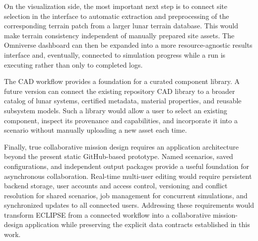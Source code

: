 On the visualization side, the most important next step is to connect site selection in the interface to automatic extraction and preprocessing of the corresponding terrain patch from a larger lunar terrain database. This would make terrain consistency independent of manually prepared site assets. The Omniverse dashboard can then be expanded into a more resource-agnostic results interface and, eventually, connected to simulation progress while a run is executing rather than only to completed logs.

The CAD workflow provides a foundation for a curated component library. A future version can connect the existing repository CAD library to a broader catalog of lunar systems, certified metadata, material properties, and reusable subsystem models. Such a library would allow a user to select an existing component, inspect its provenance and capabilities, and incorporate it into a scenario without manually uploading a new asset each time.

Finally, true collaborative mission design requires an application architecture beyond the present static GitHub-based prototype. Named scenarios, saved configurations, and independent output packages provide a useful foundation for asynchronous collaboration. Real-time multi-user editing would require persistent backend storage, user accounts and access control, versioning and conflict resolution for shared scenarios, job management for concurrent simulations, and synchronized updates to all connected users. Addressing these requirements would transform ECLIPSE from a connected workflow into a collaborative mission-design application while preserving the explicit data contracts established in this work.
